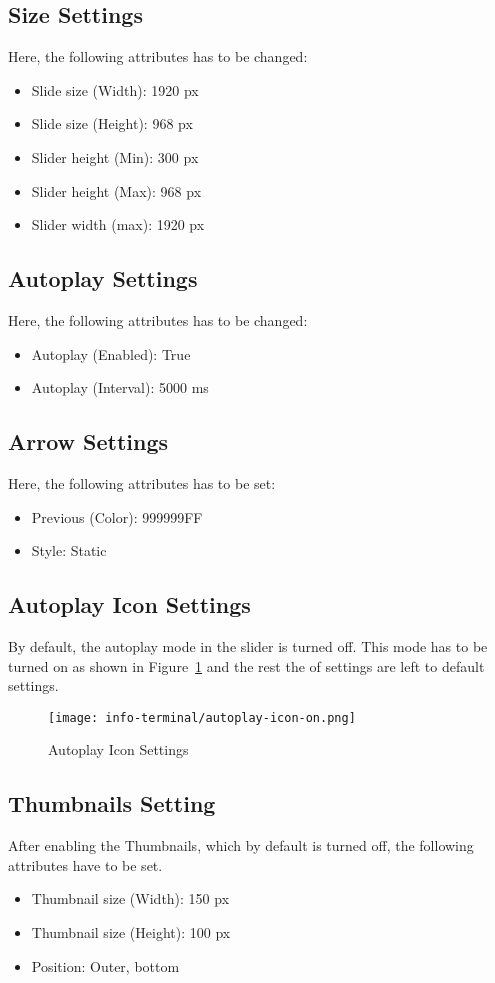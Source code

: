 \subsection*{Size Settings}
Here, the following attributes has to be changed:
\begin{itemize}
\item Slide size (Width): 1920 px
\item Slide size (Height): 968 px
\item Slider height (Min): 300 px
\item Slider height (Max): 968 px
\item Slider width (max): 1920 px
\end{itemize}

\subsection*{Autoplay Settings}
Here, the following attributes has to be changed:
\begin{itemize}
\item Autoplay (Enabled): True
\item Autoplay (Interval): 5000 ms
\end{itemize}

\subsection*{Arrow Settings}
Here, the following attributes has to be set:
\begin{itemize}
\item Previous (Color): 999999FF
\item Style: Static
\end{itemize}

\subsection*{Autoplay Icon Settings}
By default, the autoplay mode in the slider is turned off. This mode has to be turned on as shown in Figure~\ref{autoplay-icon-on} and the rest the of settings are left to default settings.
\begin{figure}[h]
\caption{Autoplay Icon Settings}
\label{autoplay-icon-on}
\centering
\texttt{[image: info-terminal/autoplay-icon-on.png]}
\end{figure}

\subsection*{Thumbnails Setting}
After enabling the Thumbnails, which by default is turned off, the following attributes have to be set.
\begin{itemize}
\item Thumbnail size (Width): 150 px
\item Thumbnail size (Height): 100 px
\item Position: Outer, bottom
\end{itemize}

